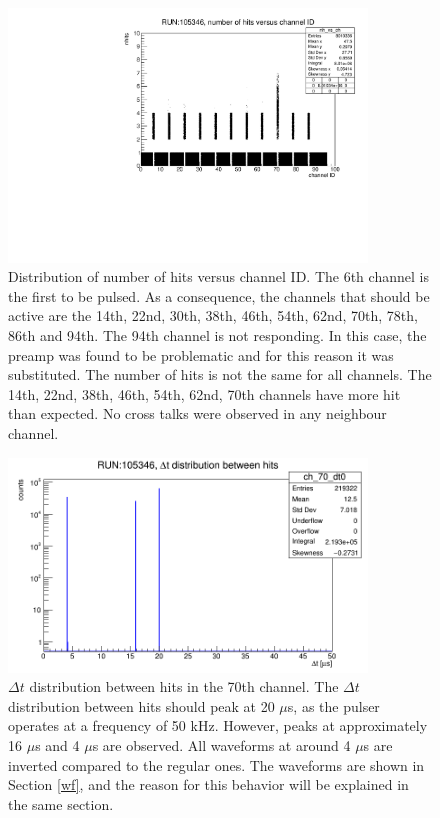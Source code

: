 \begin{figure}[!h]
  \centering
  \includegraphics[width=0.85\textwidth]{figures/pdf/run105346_nh_vs_ch.pdf}
  \caption{Distribution of number of hits versus channel ID. The 6th channel is the first to be pulsed.
  As a consequence, the channels that should be active are the 14th, 22nd, 30th, 38th, 46th, 54th, 62nd, 70th, 78th, 86th and 94th. 
  The 94th channel is not responding. In this case, the preamp was found to be problematic and for this reason it was substituted.
  The number of hits is not the same for all channels. The 14th, 22nd, 38th, 46th, 54th, 62nd, 70th channels have more hit than expected.
  No cross talks were observed in any neighbour channel.}
 \label{fig:dead}
\end{figure}


\begin{figure}[!h]
  \centering
  \includegraphics[width=0.85\textwidth]{figures/png/deltathits.png}
  \caption{$\Delta t$ distribution between hits in the 70th channel. The $\Delta t$ distribution between hits 
  should peak at 20 $\mu$s, as the pulser operates at a frequency of 50 kHz. However, peaks at approximately 
  16 $\mu$s and 4 $\mu$s are observed. All waveforms at around 4 $\mu$s are inverted compared to the regular ones. 
  The waveforms are shown in Section \ref{wf}, and the reason for this behavior will be explained in the same section.}
 \label{fig:deltatnhits}
\end{figure}

